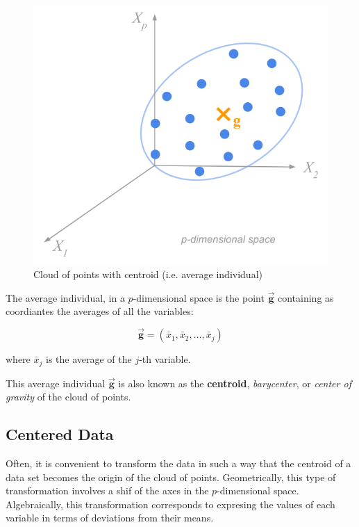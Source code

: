 \documentclass[]{book}
\begin{document}
\begin{figure}

{\centering \includegraphics[width=0.55\linewidth]{images/duality/cloud-obs-centering1} 

}

\caption{Cloud of points with centroid (i.e. average individual)}\label{fig:unnamed-chunk-13}
\end{figure}

The average individual, in a \(p\)-dimensional space is the point \(\mathbf{\vec{g}}\)
containing as coordiantes the averages of all the variables:

\[
\mathbf{\vec{g}} = (\bar{x}_1, \bar{x}_2, \dots, \bar{x}_j)
\]

where \(\bar{x}_j\) is the average of the \(j\)-th variable.

This average individual \(\mathbf{\vec{g}}\) is also known as the \textbf{centroid}, \emph{barycenter}, or \emph{center of gravity} of the cloud of points.

\hypertarget{centered-data}{%
\subsection{Centered Data}\label{centered-data}}

Often, it is convenient to transform the data in such a way that the centroid of
a data set becomes the origin of the cloud of points. Geometrically, this type
of transformation involves a shif of the axes in the \(p\)-dimensional space.
Algebraically, this transformation corresponds to expresing the values of
each variable in terms of deviations from their means.
\end{document}
